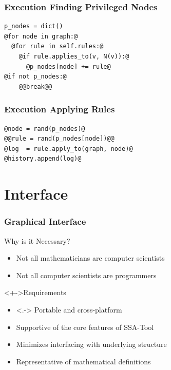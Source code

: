 \documentclass[
]{beamer}
\newcommand\st{SSA-Tool\xspace}
\begin{document}
\begin{frame}[fragile]
  \frametitle{Execution \Dash Finding Privileged Nodes}
\begin{lstlisting}[style=pystep]
p_nodes = dict()
@for node in graph:@
  @for rule in self.rules:@
    @if rule.applies_to(v, N(v)):@
      @p_nodes[node] += rule@
@if not p_nodes:@
    @@break@@
\end{lstlisting}
\end{frame}
\begin{frame}[fragile]
  \frametitle{Execution \Dash Applying Rules}
\begin{lstlisting}[style=pystep]
@node = rand(p_nodes)@
@@rule = rand(p_nodes[node])@@
@log  = rule.apply_to(graph, node)@
@history.append(log)@
\end{lstlisting}
\end{frame}

\section{Interface}
\begin{frame}
  \frametitle{Graphical Interface}
  \begin{block}{Why is it Necessary?}
    \begin{itemize}[<+->]
    \item Not all mathematicians are computer scientists
    \item Not all computer scientists are programmers
    \end{itemize}
  \end{block}
  \begin{block}<+->{Requirements}
    \begin{itemize}[<+->]
    \item<.-> Portable and cross-platform
    \item Supportive of the core features of \st
    \item Minimizes interfacing with underlying structure
    \item Representative of mathematical definitions
    \end{itemize}
  \end{block}
\end{frame}
\end{document}
